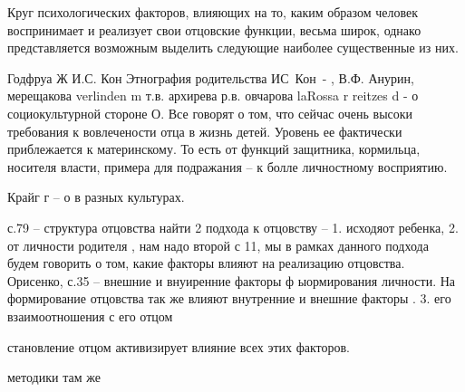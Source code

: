 \documentclass{../../common/thesisbyxetex}
\begin{document}
Круг психологических факторов, влияющих на то, каким
образом человек воспринимает и реализует свои отцовские функции, весьма широк, однако
представляется
возможным выделить следующие наиболее существенные из них.




Годфруа Ж 
И.С. Кон Этнография родительства
ИС Кон -
,
В.Ф. Анурин, мерещакова verlinden m
т.в. архирева
р.в. овчарова
laRossa r reitzes d  - о социокультурной стороне О.
Все говорят о том, что сейчас очень высоки требования к вовлечености отца в жизнь детей. Уровень ее 
фактически приблежается к материнскому. То есть от функций защитника, кормильца, носителя власти, 
примера для подражания – к болле личностному восприятию.

Крайг г – о в разных культурах.



с.79 – структура отцовства
найти
2 подхода к отцовству – 1. исходяот ребенка,
2. от личности родителя \cite[11]{psyot}, нам надо второй
с 11, мы в рамках данного подхода будем говорить о том, какие факторы влияют на реализацию 
отцовства.
Орисенко, с.35 – внешние и внуиренние факторы ф ыормирования личности. На формирование отцовства так 
же влияют внутренние и внешние факторы \cite[35]{psyot}.
3. его взаимоотношения с его отцом \cite[49]{rah}


становление отцом активизирует влияние всех этих факторов.

методики там же




\printbibliography[env=gostbibliography,sorting=ntvy]
\end{document}
